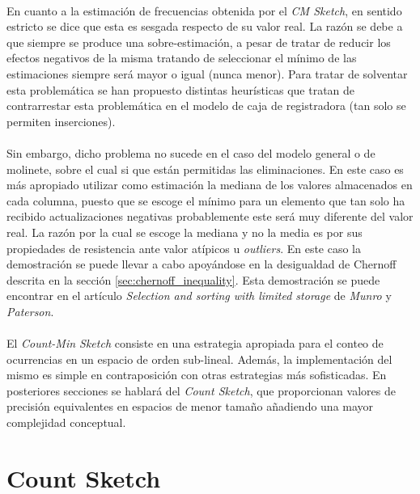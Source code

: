 \documentclass{subfiles}
\begin{document}
      \paragraph{}
      En cuanto a la estimación de frecuencias obtenida por el \emph{CM Sketch}, en sentido estricto se dice que esta es sesgada respecto de su valor real. La razón se debe a que siempre se produce una sobre-estimación, a pesar de tratar de reducir los efectos negativos de la misma tratando de seleccionar el mínimo de las estimaciones siempre será mayor o igual (nunca menor). Para tratar de solventar esta problemática se han propuesto distintas heurísticas que tratan de contrarrestar esta problemática en el modelo de caja de registradora (tan solo se permiten inserciones).

      \paragraph{}
      Sin embargo, dicho problema no sucede en el caso del modelo general o de molinete, sobre el cual si que están permitidas las eliminaciones. En este caso es más apropiado utilizar como estimación la mediana de los valores almacenados en cada columna, puesto que se escoge el mínimo para un elemento que tan solo ha recibido actualizaciones negativas probablemente este será muy diferente del valor real. La razón por la cual se escoge la mediana y no la media es por sus propiedades de resistencia ante valor atípicos u \emph{outliers}. En este caso la demostración se puede llevar a cabo apoyándose en la desigualdad de Chernoff descrita en la sección \ref{sec:chernoff_inequality}. Esta demostración se puede encontrar en el artículo \emph{Selection and sorting with limited storage }\cite{munro1980selection} de \emph{Munro} y \emph{Paterson}.

      \paragraph{}
      El \emph{Count-Min Sketch} consiste en una estrategia apropiada para el conteo de ocurrencias en un espacio de orden sub-lineal. Además, la implementación del mismo es simple en contraposición con otras estrategias más sofisticadas. En posteriores secciones se hablará del \emph{Count Sketch}, que proporcionan valores de precisión equivalentes en espacios de menor tamaño añadiendo una mayor complejidad conceptual.


    \section{Count Sketch}
    \label{sec:count_sketch}
\end{document}
